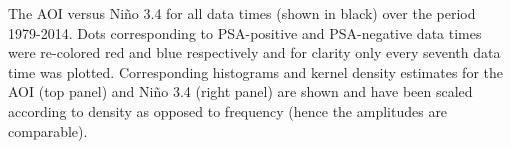 \label{fig:sam_v_enso}
The AOI versus Ni\~{n}o 3.4 for all data times (shown in black) over the period 1979-2014. Dots corresponding to PSA-positive and PSA-negative data times were re-colored red and blue respectively and for clarity only every seventh data time was plotted. Corresponding histograms and kernel density estimates for the AOI (top panel) and Ni\~{n}o 3.4 (right panel) are shown and have been scaled according to density as opposed to frequency (hence the amplitudes are comparable).